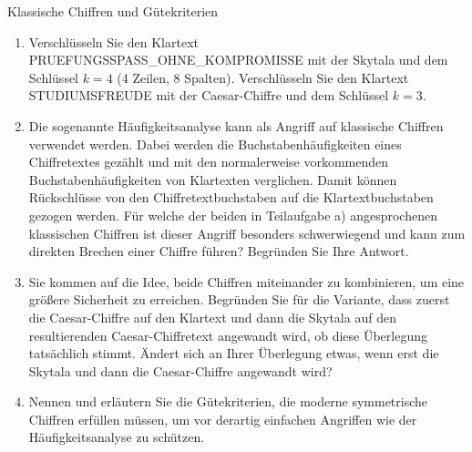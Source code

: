 \documentclass{article}
\begin{document}
\begin{exercise}{Klassische Chiffren und Gütekriterien}
  \begin{enumerate}
    \item Verschlüsseln Sie den Klartext PRUEFUNGSSPASS\_OHNE\_KOMPROMISSE mit der Skytala und dem Schlüssel $k= 4$ (4 Zeilen, 8 Spalten). Verschlüsseln Sie den Klartext STUDIUMSFREUDE mit der Caesar-Chiffre und dem Schlüssel $k= 3$.
    \item Die sogenannte Häufigkeitsanalyse kann als Angriff auf klassische Chiffren verwendet werden. Dabei werden die Buchstabenhäufigkeiten eines Chiffretextes gezählt und mit den normalerweise vorkommenden Buchstabenhäufigkeiten von Klartexten verglichen. Damit können Rückschlüsse von den Chiffretextbuchstaben auf die Klartextbuchstaben gezogen werden. Für welche der beiden in Teilaufgabe a) angesprochenen klassischen Chiffren ist dieser Angriff besonders schwerwiegend und kann zum direkten Brechen einer Chiffre führen? Begründen Sie Ihre Antwort.
    \item Sie kommen auf die Idee, beide Chiffren miteinander zu kombinieren, um eine größere Sicherheit zu erreichen. Begründen Sie für die Variante, dass zuerst die Caesar-Chiffre auf den Klartext und dann die Skytala auf den resultierenden Caesar-Chiffretext angewandt wird, ob diese Überlegung tatsächlich stimmt. Ändert sich an Ihrer Überlegung etwas, wenn erst die Skytala und dann die Caesar-Chiffre angewandt wird?
    \item Nennen und erläutern Sie die Gütekriterien, die moderne symmetrische Chiffren erfüllen müssen, um vor derartig einfachen Angriffen wie der Häufigkeitsanalyse zu schützen.
  \end{enumerate}


\end{exercise}
\end{document}
